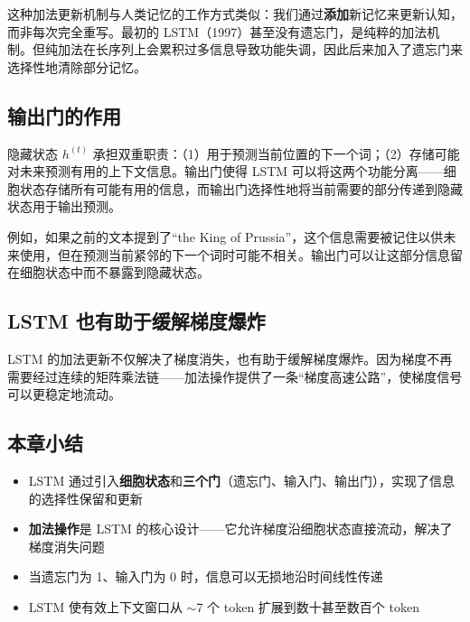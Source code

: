 这种加法更新机制与人类记忆的工作方式类似：我们通过\textbf{添加}新记忆来更新认知，而非每次完全重写。最初的 LSTM（1997）甚至没有遗忘门，是纯粹的加法机制。但纯加法在长序列上会累积过多信息导致功能失调，因此后来加入了遗忘门来选择性地清除部分记忆。

\subsection{输出门的作用}

隐藏状态 $h^{(t)}$ 承担双重职责：（1）用于预测当前位置的下一个词；（2）存储可能对未来预测有用的上下文信息。输出门使得 LSTM 可以将这两个功能分离——细胞状态存储所有可能有用的信息，而输出门选择性地将当前需要的部分传递到隐藏状态用于输出预测。

例如，如果之前的文本提到了``the King of Prussia''，这个信息需要被记住以供未来使用，但在预测当前紧邻的下一个词时可能不相关。输出门可以让这部分信息留在细胞状态中而不暴露到隐藏状态。

\subsection{LSTM 也有助于缓解梯度爆炸}

LSTM 的加法更新不仅解决了梯度消失，也有助于缓解梯度爆炸。因为梯度不再需要经过连续的矩阵乘法链——加法操作提供了一条``梯度高速公路''，使梯度信号可以更稳定地流动。

\subsection{本章小结}

\begin{itemize}
    \item LSTM 通过引入\textbf{细胞状态}和\textbf{三个门}（遗忘门、输入门、输出门），实现了信息的选择性保留和更新
    \item \textbf{加法操作}是 LSTM 的核心设计——它允许梯度沿细胞状态直接流动，解决了梯度消失问题
    \item 当遗忘门为 1、输入门为 0 时，信息可以无损地沿时间线性传递
    \item LSTM 使有效上下文窗口从 $\sim$7 个 token 扩展到数十甚至数百个 token
\end{itemize}


